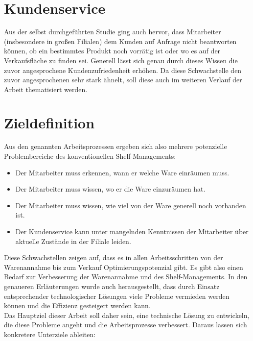 \section{Kundenservice}
\label{sec:bedarf_kundenservice}
Aus der selbst durchgeführten Studie ging auch hervor, dass Mitarbeiter (insbesondere in großen Filialen) dem Kunden auf Anfrage nicht beantworten können, ob ein bestimmtes Produkt noch vorrätig ist oder wo es auf der Verkaufsfläche zu finden sei. Generell lässt sich genau durch dieses Wissen die zuvor angesprochene Kundenzufriedenheit erhöhen. Da diese Schwachstelle den zuvor angesprochenen sehr stark ähnelt, soll diese auch im weiteren Verlauf der Arbeit thematisiert werden. 

\section{Zieldefinition}
\label{sec:zieldefinition}
Aus den genannten Arbeitsprozessen ergeben sich also mehrere potenzielle Problembereiche des konventionellen Shelf-Managements:

\begin{itemize}
	\item Der Mitarbeiter muss erkennen, wann er welche Ware einräumen muss.
	\item Der Mitarbeiter muss wissen, wo er die Ware einzuräumen hat.
	\item Der Mitarbeiter muss wissen, wie viel von der Ware generell noch vorhanden ist.
	\item Der Kundenservice kann unter mangelnden Kenntnissen der Mitarbeiter über aktuelle Zustände in der Filiale leiden.
\end{itemize}

Diese Schwachstellen zeigen auf, dass es in allen Arbeitsschritten von der Warenannahme bis zum Verkauf Optimierungspotenzial gibt. Es gibt also einen Bedarf zur Verbesserung der Warenannahme und des Shelf-Managements. In den genaueren Erläuterungen wurde auch herausgestellt, dass durch Einsatz entsprechender technologischer Lösungen viele Probleme vermieden werden können und die Effizienz gesteigert werden kann.\\
Das Hauptziel dieser Arbeit soll daher sein, eine technische Lösung zu entwickeln, die diese Probleme angeht und die Arbeitsprozesse verbessert. Daraus lassen sich konkretere Unterziele ableiten:


